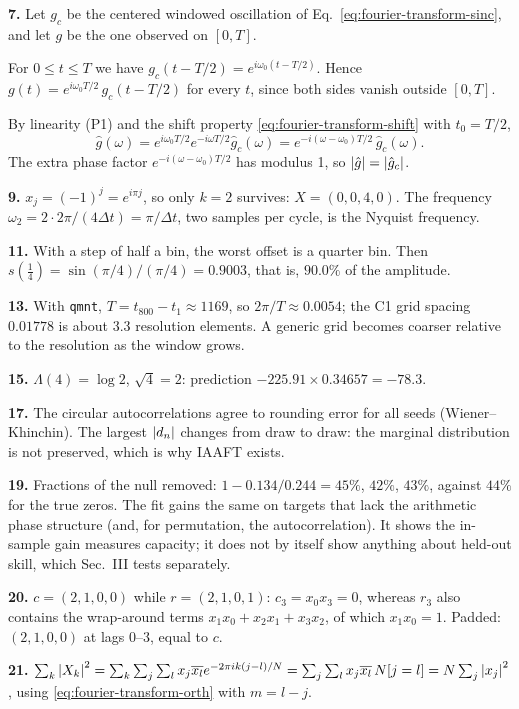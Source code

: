 \textbf{7.} Let $g_c$ be the centered windowed oscillation of Eq.~\eqref{eq:fourier-transform-sinc}, and let $g$ be the one observed on $[0,T]$.

For $0\le t\le T$ we have $g_c(t-T/2)=e^{i\omega_0(t-T/2)}$. Hence $g(t)=e^{i\omega_0T/2}\,g_c(t-T/2)$ for every $t$, since both sides vanish outside $[0,T]$.

By linearity (P1) and the shift property \eqref{eq:fourier-transform-shift} with $t_0=T/2$,
\[\hat g(\omega)=e^{i\omega_0T/2}e^{-i\omega T/2}\hat g_c(\omega)=e^{-i(\omega-\omega_0)T/2}\,\hat g_c(\omega).\]
The extra phase factor $e^{-i(\omega-\omega_0)T/2}$ has modulus 1, so $\left\lvert \hat g\right\rvert=\left\lvert \hat g_c\right\rvert$.

\textbf{9.} $x_j=(-1)^j=e^{i\pi j}$, so only $k=2$ survives: $X=(0,0,4,0)$. The frequency $\omega_2=2\cdot2\pi/(4\Delta t)=\pi/\Delta t$, two samples per cycle, is the Nyquist frequency.

\textbf{11.} With a step of half a bin, the worst offset is a quarter bin. Then $s(\frac14)=\sin(\pi/4)/(\pi/4)=0.9003$, that is, $90.0\%$ of the amplitude.

\textbf{13.} With \texttt{qmnt}, $T=t_{800}-t_1\approx1169$, so $2\pi/T\approx0.0054$; the C1 grid spacing $0.01778$ is about $3.3$ resolution elements. A generic grid becomes coarser relative to the resolution as the window grows.

\textbf{15.} $\Lambda(4)=\log2$, $\sqrt4=2$: prediction $-225.91\times0.34657=-78.3$.

\textbf{17.} The circular autocorrelations agree to rounding error for all seeds (Wiener--Khinchin). The largest $\left\lvert d_n\right\rvert$ changes from draw to draw: the marginal distribution is not preserved, which is why IAAFT \cite{schreiber} exists.

\textbf{19.} Fractions of the null removed: $1-0.134/0.244=45\%$, $42\%$, $43\%$, against $44\%$ for the true zeros. The fit gains the same on targets that lack the arithmetic phase structure (and, for permutation, the autocorrelation). It shows the in-sample gain measures capacity; it does not by itself show anything about held-out skill, which Sec.~III tests separately.

\textbf{20.} $c=(2,1,0,0)$ while $r=(2,1,0,1)$: $c_3=x_0x_3=0$, whereas $r_3$ also contains the wrap-around terms $x_1x_0+x_2x_1+x_3x_2$, of which $x_1x_0=1$. Padded: $(2,1,0,0)$ at lags $0$--$3$, equal to $c$.

\textbf{21.} $\sum_k\left\lvert X_k\right\rvert^2=\sum_k\sum_j\sum_l x_j\overline{x_l}e^{-2\pi ik(j-l)/N}=\sum_j\sum_lx_j\overline{x_l}\,N[j=l]=N\sum_j\left\lvert x_j\right\rvert^2$, using \eqref{eq:fourier-transform-orth} with $m=l-j$.

